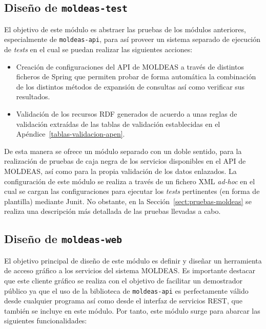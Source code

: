 \clearpage
\subsection{Diseño de \texttt{moldeas-test}}\label{sect:moldeas-test}
El objetivo de este módulo es abstraer las pruebas de los módulos anteriores, 
especialmente de \texttt{moldeas-api}, para así proveer un sistema separado 
de ejecución de \textit{tests} en el cual se puedan realizar las siguientes 
acciones:

\begin{itemize}
 \item Creación de configuraciones del \gls{API} de \gls{MOLDEAS} a través de distintos 
ficheros de Spring que permiten probar de forma automática la combinación 
de los distintos métodos de expansión de consultas así como verificar 
sus resultados.
\item Validación de los recursos \gls{RDF} generados de acuerdo a unas reglas de validación 
extraídas de las tablas de validación establecidas en el Apéndice~\ref{tablas-validacion-apen}.
\end{itemize}

De esta manera se ofrece un módulo separado con un doble sentido, para la realización de pruebas de caja negra de los 
servicios disponibles en el API de MOLDEAS, así como para la propia validación de los datos enlazados. La configuración 
de este módulo se realiza a través de un fichero \gls{XML} \textit{ad-hoc} en el cual se cargan las configuraciones 
para ejecutar los \textit{tests} pertinentes (en forma de plantilla) mediante Junit. No obstante, en la Sección~\ref{sect:pruebas-moldeas} se realiza una descripción 
más detallada de las pruebas llevadas a cabo.


\subsection{Diseño de \texttt{moldeas-web}}\label{sect:moldeas-web}
El objetivo principal de diseño de este módulo es definir y diseñar un herramienta de acceso gráfico 
a los servicios del sistema \gls{MOLDEAS}. Es importante destacar que este cliente gráfico se realiza con el objetivo de facilitar 
un demostrador público ya que el uso de la biblioteca de \texttt{moldeas-api} es perfectamente 
válido desde cualquier programa así como desde el interfaz de servicios REST, que también se incluye 
en este módulo. Por tanto, este módulo surge para abarcar las siguientes funcionalidades:

